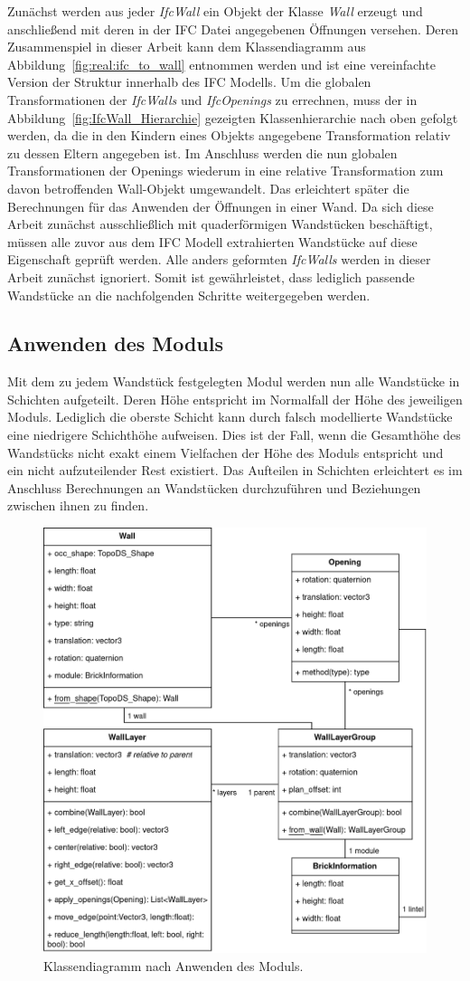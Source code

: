 Zunächst werden aus jeder \textit{IfcWall} ein Objekt der Klasse \textit{Wall} erzeugt und anschließend mit deren in der IFC Datei angegebenen Öffnungen versehen.
Deren Zusammenspiel in dieser Arbeit kann dem Klassendiagramm aus Abbildung~\ref{fig:real:ifc_to_wall} entnommen werden und ist eine vereinfachte Version der Struktur innerhalb des IFC Modells.
Um die globalen Transformationen der \textit{IfcWalls} und \textit{IfcOpenings} zu errechnen, muss der in Abbildung~\ref{fig:IfcWall_Hierarchie} gezeigten Klassenhierarchie nach oben gefolgt werden, da die in den Kindern eines Objekts angegebene Transformation relativ zu dessen Eltern angegeben ist.
Im Anschluss werden die nun globalen Transformationen der Openings wiederum in eine relative Transformation zum davon betroffenden Wall-Objekt umgewandelt.
Das erleichtert später die Berechnungen für das Anwenden der Öffnungen in einer Wand.
Da sich diese Arbeit zunächst ausschließlich mit quaderförmigen Wandstücken beschäftigt, müssen alle zuvor aus dem IFC Modell extrahierten Wandstücke auf diese Eigenschaft geprüft werden.
Alle anders geformten \textit{IfcWalls} werden in dieser Arbeit zunächst ignoriert.
Somit ist gewährleistet, dass lediglich passende Wandstücke an die nachfolgenden Schritte weitergegeben werden.

\subsection{Anwenden des Moduls}
Mit dem zu jedem Wandstück festgelegten Modul werden nun alle Wandstücke in Schichten aufgeteilt.
Deren Höhe entspricht im Normalfall der Höhe des jeweiligen Moduls.
Lediglich die oberste Schicht kann durch falsch modellierte Wandstücke eine niedrigere Schichthöhe aufweisen.
Dies ist der Fall, wenn die Gesamthöhe des Wandstücks nicht exakt einem Vielfachen der Höhe des Moduls entspricht und ein nicht aufzuteilender Rest existiert.
Das Aufteilen in Schichten erleichtert es im Anschluss Berechnungen an Wandstücken durchzuführen und Beziehungen zwischen ihnen zu finden.
\begin{figure}[hbt]
  \centering
  \includegraphics[width=0.7\columnwidth]{fig/klassendiagramm_apply_module.drawio.png}
  \caption{Klassendiagramm nach Anwenden des Moduls.}
  \label{fig:real:apply_module}
\end{figure}

